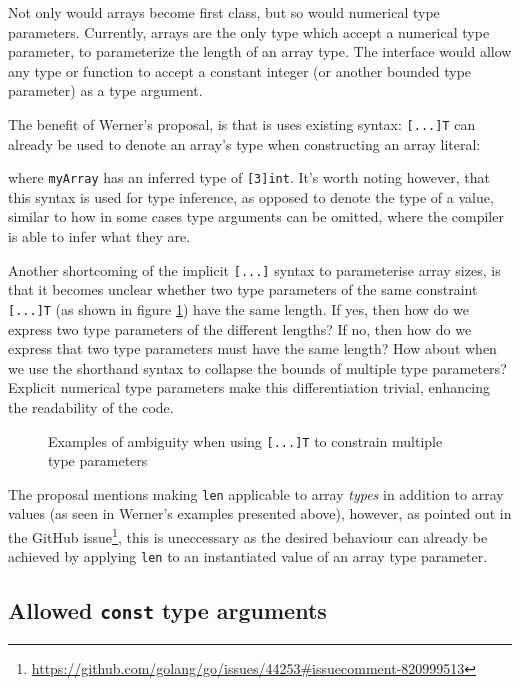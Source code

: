 Not only would arrays become first class, but so would numerical type
parameters. Currently, arrays are the only type which accept a numerical type
parameter, to parameterize the length of an array type. The  interface
would allow any type or function to accept a constant integer (or another
 bounded type parameter) as a type argument.

The benefit of Werner's proposal, is that is uses existing syntax:
\texttt{[...]T} can already be used to denote an array's type when constructing
an array literal:


where \texttt{myArray} has an inferred type of \texttt{[3]int}. It's worth
noting however, that this syntax is used for type inference, as opposed to
denote the type of a value, similar to how in some cases type arguments can be
omitted, where the compiler is able to infer what they are.

Another shortcoming of the implicit \texttt{[...]} syntax to parameterise array
sizes, is that it becomes unclear whether two type parameters of the same
constraint \texttt{[...]T} (as shown in figure \ref{fig:werner-ambiguity}) have
the same length. If yes, then how do we express two type parameters of the
different lengths? If no, then how do we express that two type parameters must
have the same length? How about when we use the shorthand syntax to collapse the
bounds of multiple type parameters? Explicit numerical type parameters make this
differentiation trivial, enhancing the readability of the code.

\begin{figure}
    \caption{Examples of ambiguity when using \texttt{[...]T} to constrain
        multiple type parameters}
    \label{fig:werner-ambiguity}
\end{figure}

The proposal mentions making \texttt{len} applicable to array \emph{types} in
addition to array values (as seen in Werner's examples presented above),
however, as pointed out in the GitHub
issue\footnote{\url{https://github.com/golang/go/issues/44253\#issuecomment-820999513}},
this is uneccessary as the desired behaviour can already be achieved by applying
\texttt{len} to an instantiated value of an array type parameter.

\subsection{Allowed \texttt{const} type arguments}

